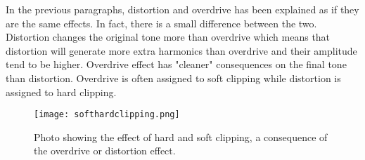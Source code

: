 In the previous paragraphs, distortion and overdrive has been explained as if they are the same effects. In fact, there is a small difference between the two. Distortion changes the original tone more than overdrive which means that distortion will generate more extra harmonics than overdrive and their amplitude tend to be higher. Overdrive effect has "cleaner" consequences on the final tone than distortion. Overdrive is often assigned to soft clipping while distortion is assigned to hard clipping.

\begin{figure} [htbp]
  \texttt{[image: softhardclipping.png]}
  \caption{Photo showing the effect of hard and soft clipping, a consequence of the overdrive or distortion effect.}
  \label{fig:clipping2}
\end{figure}


